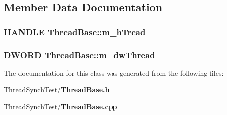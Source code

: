\subsection{Member Data Documentation}
\subsubsection{\setlength{\rightskip}{0pt plus 5cm}HANDLE {\bf Thread\-Base::m\_\-h\-Tread}\hspace{0.3cm}{\tt  [private]}}\label{class_thread_base_6043149387a23497ab5121460f58ba25}


\subsubsection{\setlength{\rightskip}{0pt plus 5cm}DWORD {\bf Thread\-Base::m\_\-dw\-Thread}\hspace{0.3cm}{\tt  [private]}}\label{class_thread_base_d60930f9341746e60b77fc25d59a4b0d}




The documentation for this class was generated from the following files:\begin{CompactItemize}
\item 
Thread\-Synch\-Test/{\bf Thread\-Base.h}\item 
Thread\-Synch\-Test/{\bf Thread\-Base.cpp}\end{CompactItemize}
